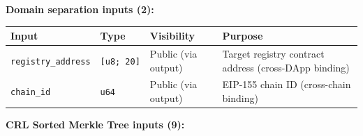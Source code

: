 \documentclass[11pt, a4paper]{article}
\begin{document}
\textbf{Domain separation inputs (2):}

\begin{longtable}[]{@{}
  >{\raggedright\arraybackslash}p{}
  >{\raggedright\arraybackslash}p{}
  >{\raggedright\arraybackslash}p{}
  >{\raggedright\arraybackslash}p{}@{}}
\toprule\noalign{}
\begin{minipage}[b]{\linewidth}\raggedright
Input
\end{minipage} & \begin{minipage}[b]{\linewidth}\raggedright
Type
\end{minipage} & \begin{minipage}[b]{\linewidth}\raggedright
Visibility
\end{minipage} & \begin{minipage}[b]{\linewidth}\raggedright
Purpose
\end{minipage} \\
\midrule\noalign{}
\endhead
\bottomrule\noalign{}
\endlastfoot
\texttt{registry\_address} & \texttt{{[}u8;\ 20{]}} & Public (via
output) & Target registry contract address (cross-DApp binding) \\
\texttt{chain\_id} & \texttt{u64} & Public (via output) & EIP-155 chain
ID (cross-chain binding) \\
\end{longtable}

\textbf{CRL Sorted Merkle Tree inputs (9):}
\end{document}
